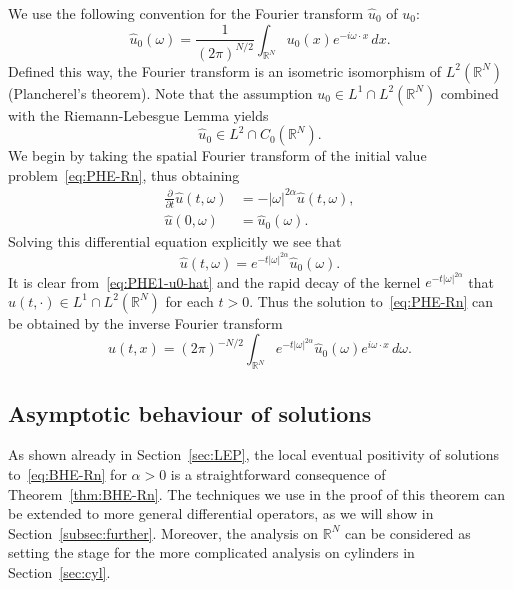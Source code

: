\documentclass[a4paper, reqno,titlepage]{amsart}
\numberwithin{equation}{section}
\theoremstyle{plain}
\theoremstyle{definition}
\theoremstyle{remark}
\newcommand{\RR}{\mathbb{R}}
\begin{document}
We use the following convention for the Fourier transform $\widehat{u}_0$ of $u_0$:
\begin{equation*}
  \widehat{u}_0(\omega)
  = \frac{1}{(2\pi)^{N/2}} \int_{\RR^N} u_0(x) e^{-i \omega \cdot x} \,dx.
\end{equation*}
Defined this way, the Fourier transform is an isometric isomorphism of $L^2(\RR^N)$ (Plancherel's theorem). Note that the assumption $u_0 \in L^1 \cap L^2(\RR^N)$ combined with the Riemann-Lebesgue Lemma yields
\begin{equation}
  \label{eq:PHE1-u0-hat}
  \widehat{u}_0 \in L^2\cap C_0(\RR^N).
\end{equation}
We begin by taking the spatial Fourier transform of the initial value problem~\eqref{eq:PHE-Rn}, thus obtaining
\begin{equation*}
  \begin{aligned}
    \frac{\partial}{\partial t}\widehat{u}(t,\omega)
     & = -|\omega|^{2\alpha} \widehat{u}(t,\omega), \\
    \widehat{u}(0, \omega)
     & = \widehat{u}_0(\omega).
  \end{aligned}
\end{equation*}
Solving this differential equation explicitly we see that
\begin{equation*}
  \widehat{u}(t, \omega) = e^{-t|\omega|^{2\alpha}} \widehat{u}_0(\omega).
\end{equation*}
It is clear from~\eqref{eq:PHE1-u0-hat} and the rapid decay of the kernel $e^{-t|\omega|^{2\alpha}}$ that $\widehat{u}(t, \cdot) \in L^1 \cap L^2(\RR^N)$ for each $t > 0$. Thus the solution to~\eqref{eq:PHE-Rn} can be obtained by the inverse Fourier transform
\begin{equation}
  \label{eq:PHE-Rn-sol}
  u(t, x) = (2\pi)^{-N/2}\int_{\RR^N} e^{-t|\omega|^{2\alpha}} \widehat{u}_0(\omega) e^{i \omega \cdot x} \,d\omega.
\end{equation}

\subsection{Asymptotic behaviour of solutions}

As shown already in Section~\ref{sec:LEP}, the local eventual positivity of solutions to~\eqref{eq:BHE-Rn} for $\alpha>0$ is a straightforward consequence of Theorem~\ref{thm:BHE-Rn}. The techniques we use in the proof of this theorem can be extended to more general differential operators, as we will show in  Section~\ref{subsec:further}. Moreover, the analysis on $\RR^N$ can be considered as setting the stage for the more complicated analysis on cylinders in Section~\ref{sec:cyl}.
\end{document}
